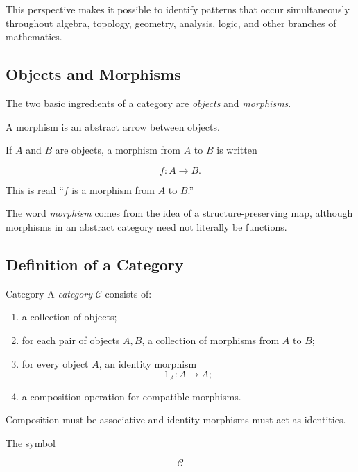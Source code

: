 This perspective makes it possible to identify patterns that occur
simultaneously throughout algebra, topology, geometry, analysis, logic, and
other branches of mathematics.

\subsection{Objects and Morphisms}
\label{subsec:objects-morphisms}

The two basic ingredients of a category are \emph{objects} and
\emph{morphisms}.

A morphism is an abstract arrow between objects.

If \(A\) and \(B\) are objects, a morphism from \(A\) to \(B\) is written

\[ f:A\to B. \]

This is read ``\(f\) is a morphism from \(A\) to \(B\).''

The word \emph{morphism} comes from the idea of a structure-preserving map,
although morphisms in an abstract category need not literally be functions.

\subsection{Definition of a Category}
\label{subsec:category-definition}

\begin{definitionbox}{Category}
A \emph{category} \(\mathcal C\) consists of:
\begin{enumerate}
    \item a collection of objects;
    \item for each pair of objects \(A,B\), a collection of morphisms
    from \(A\) to \(B\);
    \item for every object \(A\), an identity morphism
    \[ 1_A:A\to A; \]
    \item a composition operation for compatible morphisms.
\end{enumerate}
Composition must be associative and identity morphisms must act as identities.
\end{definitionbox}

The symbol

\[ \mathcal C \]

